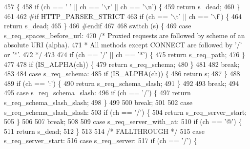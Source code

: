 \begin{DoxyCode}
457 \{
458   \textcolor{keywordflow}{if} (ch == \textcolor{charliteral}{' '} || ch == \textcolor{charliteral}{'\(\backslash\)r'} || ch == \textcolor{charliteral}{'\(\backslash\)n'}) \{
459     \textcolor{keywordflow}{return} s_dead;
460   \}
461 
462 \textcolor{preprocessor}{#if HTTP\_PARSER\_STRICT}
463   \textcolor{keywordflow}{if} (ch == \textcolor{charliteral}{'\(\backslash\)t'} || ch == \textcolor{charliteral}{'\(\backslash\)f'}) \{
464     \textcolor{keywordflow}{return} s_dead;
465   \}
466 \textcolor{preprocessor}{#endif}
467 
468   \textcolor{keywordflow}{switch} (s) \{
469     \textcolor{keywordflow}{case} s_req_spaces_before_url:
470       \textcolor{comment}{/* Proxied requests are followed by scheme of an absolute URI (alpha).}
471 \textcolor{comment}{       * All methods except CONNECT are followed by '/' or '*'.}
472 \textcolor{comment}{       */}
473 
474       \textcolor{keywordflow}{if} (ch == \textcolor{charliteral}{'/'} || ch == \textcolor{charliteral}{'*'}) \{
475         \textcolor{keywordflow}{return} s_req_path;
476       \}
477 
478       \textcolor{keywordflow}{if} (IS_ALPHA(ch)) \{
479         \textcolor{keywordflow}{return} s_req_schema;
480       \}
481 
482       \textcolor{keywordflow}{break};
483 
484     \textcolor{keywordflow}{case} s_req_schema:
485       \textcolor{keywordflow}{if} (IS_ALPHA(ch)) \{
486         \textcolor{keywordflow}{return} s;
487       \}
488 
489       \textcolor{keywordflow}{if} (ch == \textcolor{charliteral}{':'}) \{
490         \textcolor{keywordflow}{return} s_req_schema_slash;
491       \}
492 
493       \textcolor{keywordflow}{break};
494 
495     \textcolor{keywordflow}{case} s_req_schema_slash:
496       \textcolor{keywordflow}{if} (ch == \textcolor{charliteral}{'/'}) \{
497         \textcolor{keywordflow}{return} s_req_schema_slash_slash;
498       \}
499 
500       \textcolor{keywordflow}{break};
501 
502     \textcolor{keywordflow}{case} s_req_schema_slash_slash:
503       \textcolor{keywordflow}{if} (ch == \textcolor{charliteral}{'/'}) \{
504         \textcolor{keywordflow}{return} s_req_server_start;
505       \}
506 
507       \textcolor{keywordflow}{break};
508 
509     \textcolor{keywordflow}{case} s_req_server_with_at:
510       \textcolor{keywordflow}{if} (ch == \textcolor{charliteral}{'@'}) \{
511         \textcolor{keywordflow}{return} s_dead;
512       \}
513 
514     \textcolor{comment}{/* FALLTHROUGH */}
515     \textcolor{keywordflow}{case} s_req_server_start:
516     \textcolor{keywordflow}{case} s_req_server:
517       \textcolor{keywordflow}{if} (ch == \textcolor{charliteral}{'/'}) \{

\end{DoxyCode}
